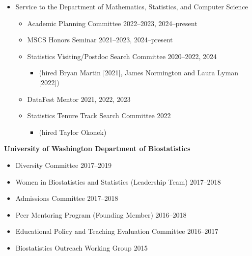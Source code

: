 \documentclass[margin]{res}
\begin{document}
\begin{resume}
\begin{itemize}
	\item Service to the Department of Mathematics, Statistics, and Computer Science
		\begin{itemize}
		\item Academic Planning Committee \hfill 2022--2023, 2024--present
		\item MSCS Honors Seminar  \hfill 2021--2023, 2024--present %
		\item Statistics Visiting/Postdoc Search Committee \hfill 2020--2022, 2024
			\begin{itemize} \vspace{-0.2cm}
			\item[]  \begin{footnotesize}(hired Bryan Martin [2021], James Normington and Laura Lyman [2022]) \end{footnotesize}
			\end{itemize} \vspace{-0.1cm}
		\item DataFest Mentor  \hfill 2021, 2022, 2023
		\item Statistics Tenure Track Search Committee \hfill 2022 
			\begin{itemize} \vspace{-0.2cm}
			\item[] \begin{footnotesize}(hired Taylor Okonek)\end{footnotesize} 
			\end{itemize} \vspace{-0.1cm}
		\end{itemize}
		
	\end{itemize}


\textbf{University of Washington Department of Biostatistics}
\begin{itemize} %
	\item Diversity Committee \hfill 2017--2019
	\item Women in Biostatistics and Statistics (Leadership Team) \hfill 2017--2018
	\item Admissions Committee \hfill 2017--2018
	\item Peer Mentoring Program (Founding Member) \hfill 2016--2018
	\item Educational Policy and Teaching Evaluation Committee \hfill 2016--2017
	\item Biostatistics Outreach Working Group \hfill 2015%
\end{itemize}


\end{resume}
\end{document}
